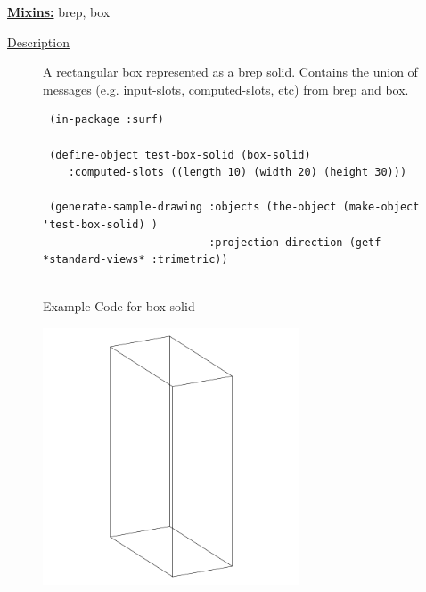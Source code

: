 \documentclass [11pt]{book}
\begin{document}
\begin{itemize}
\textbf{
\underline{Mixins:}} brep, box





\begin{description}

\item [
\underline{Description}]


A rectangular box represented as a brep solid. Contains the union of messages (e.g. input-slots, computed-slots, etc)
from brep and box.



\end{description}




\begin{figure}
\begin{lrbox}{\boxedverb}
\begin{minipage}{\linewidth}
{\small

\begin{verbatim}
 (in-package :surf)

 (define-object test-box-solid (box-solid)
    :computed-slots ((length 10) (width 20) (height 30)))

 (generate-sample-drawing :objects (the-object (make-object 'test-box-solid) )
                          :projection-direction (getf *standard-views* :trimetric))


\end{verbatim}}
\end{minipage}
\end{lrbox}
\fbox{\usebox{\boxedverb}}

\caption{Example Code for box-solid}

\label{fig:example-code-box-solid}

\end{figure}

\begin{figure}
\begin{center}
\includegraphics[width=3in,height=3in]{../images/example-box-solid.pdf}
\end{center}


\end{figure}
\end{itemize}
\end{document}
